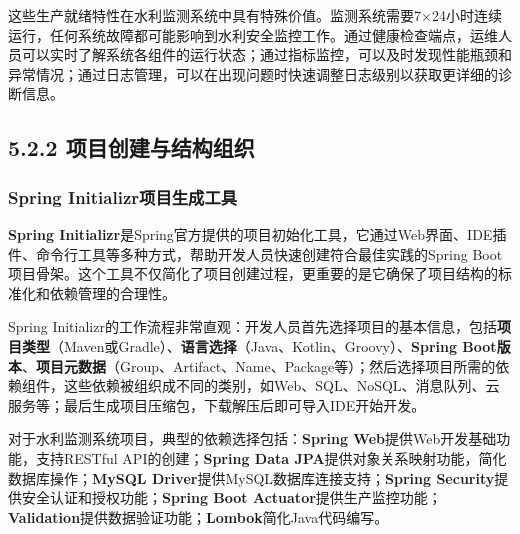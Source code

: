 这些生产就绪特性在水利监测系统中具有特殊价值。监测系统需要7×24小时连续运行，任何系统故障都可能影响到水利安全监控工作。通过健康检查端点，运维人员可以实时了解系统各组件的运行状态；通过指标监控，可以及时发现性能瓶颈和异常情况；通过日志管理，可以在出现问题时快速调整日志级别以获取更详细的诊断信息。

\subsection{5.2.2 项目创建与结构组织}\label{ux9879ux76eeux521bux5efaux4e0eux7ed3ux6784ux7ec4ux7ec7}

\subsubsection{Spring Initializr项目生成工具}\label{spring-initializrux9879ux76eeux751fux6210ux5de5ux5177}

\textbf{Spring Initializr}是Spring官方提供的项目初始化工具，它通过Web界面、IDE插件、命令行工具等多种方式，帮助开发人员快速创建符合最佳实践的Spring Boot项目骨架。这个工具不仅简化了项目创建过程，更重要的是它确保了项目结构的标准化和依赖管理的合理性。

Spring Initializr的工作流程非常直观：开发人员首先选择项目的基本信息，包括\textbf{项目类型}（Maven或Gradle）、\textbf{语言选择}（Java、Kotlin、Groovy）、\textbf{Spring Boot版本}、\textbf{项目元数据}（Group、Artifact、Name、Package等）；然后选择项目所需的依赖组件，这些依赖被组织成不同的类别，如Web、SQL、NoSQL、消息队列、云服务等；最后生成项目压缩包，下载解压后即可导入IDE开始开发。

对于水利监测系统项目，典型的依赖选择包括：\textbf{Spring Web}提供Web开发基础功能，支持RESTful API的创建；\textbf{Spring Data JPA}提供对象关系映射功能，简化数据库操作；\textbf{MySQL Driver}提供MySQL数据库连接支持；\textbf{Spring Security}提供安全认证和授权功能；\textbf{Spring Boot Actuator}提供生产监控功能；\textbf{Validation}提供数据验证功能；\textbf{Lombok}简化Java代码编写。

